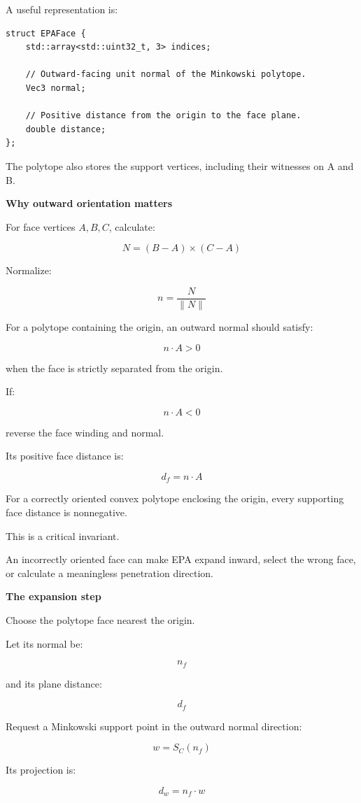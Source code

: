 A useful representation is:

\begin{verbatim}
struct EPAFace {
    std::array<std::uint32_t, 3> indices;

    // Outward-facing unit normal of the Minkowski polytope.
    Vec3 normal;

    // Positive distance from the origin to the face plane.
    double distance;
};
\end{verbatim}

The polytope also stores the support vertices, including their witnesses on A and B.

\textbf{Why outward orientation matters}

For face vertices \(A,B,C\), calculate:

\[
N=(B-A)\times(C-A)
\]

Normalize:

\[
n=\frac N{\|N\|}
\]

For a polytope containing the origin, an outward normal should satisfy:

\[
n\cdot A>0
\]

when the face is strictly separated from the origin.

If:

\[
n\cdot A<0
\]

reverse the face winding and normal.

Its positive face distance is:

\[
\boxed{ d_f=n\cdot A }
\]

For a correctly oriented convex polytope enclosing the origin, every supporting face distance is nonnegative.

This is a critical invariant.

An incorrectly oriented face can make EPA expand inward, select the wrong face, or calculate a meaningless penetration direction.

\textbf{The expansion step}

Choose the polytope face nearest the origin.

Let its normal be:

\[
n_f
\]

and its plane distance:

\[
d_f
\]

Request a Minkowski support point in the outward normal direction:

\[
\boxed{ w=S_C(n_f) }
\]

Its projection is:

\[
\boxed{ d_w=n_f\cdot w }
\]

